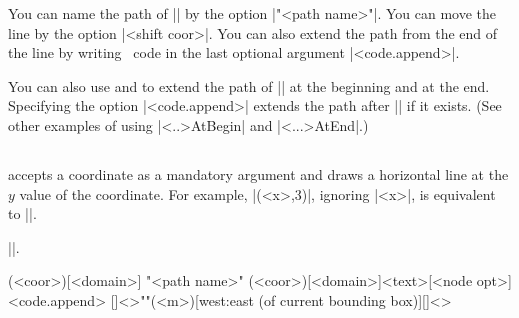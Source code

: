 \begin{tzcode}{.3}
{}
\end{tzcode}

You can name the path of |\tzhfnat| by the option |"<path name>"|.
You can move the line by the option |<shift coor>|.
You can also extend the path from the end of the line by writing \Tikz\ code in the last optional argument |<code.append>|.

\begin{tzcode}{.3}
\end{tzcode}

You can also use \icmd{\tzhfnatAtBegin} and \icmd{\tzhfnatAtEnd} to extend the path of |\tzhfnat| at the beginning and at the end. Specifying the option |<code.append>| extends the path after |\tzhfnatAtEnd| if it exists.
(See other examples of using |\tz<..>AtBegin| and |\tz<...>AtEnd|.)


\subsection{\protect\cmd{\tzhfn}}
\label{ss:tzhfn}

\icmd{\tzhfn} accepts a coordinate as a mandatory argument and draws a horizontal line at the $y$ value of the coordinate.
For example, |\tzhfn(<x>,3)|, ignoring |<x>|, is equivalent to ||.

 |\tzhfnat|.

\begin{tzdef}
\tzhfn(<coor>)[<domain>]
  "<path name>"
        (<coor>)[<domain>]{<text>}[<node opt>]<code.append>
  []<>""(<m>)[west:east (of current bounding box)]{}[]<>
\end{tzdef}

\begin{tzcode}{.3}
\end{tzcode}

